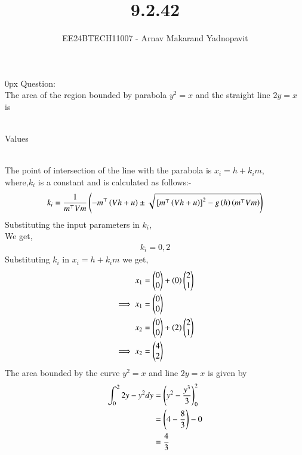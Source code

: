 \documentclass[journal]{IEEEtran}
\begin{document}

\title{9.2.42}
\author{EE24BTECH11007 - Arnav Makarand Yadnopavit}
{\let\newpage\relax\maketitle}
\renewcommand{\thefigure}{\theenumi}
\renewcommand{\thetable}{\theenumi}
\setlength{\intextsep}{10pt} %
\renewcommand{\thetable}{\theenumi}
\parindent 0px
Question:\\
The area of the region bounded by parabola $y^2 = x$ and the straight line $2y = x$ is\\
\solution\\
\begin{table}[h]
    \centering
    
    \caption{Values}
    \label{tab:1}
\end{table}\\
The point of intersection of the line with the parabola is $x_i=h+k_i m$,\\
where,$k_i$ is a constant and is calculated as follows:-
\begin{align}
    k_i=\frac{1}{m^\top Vm}\left(-m^\top \left(Vh+u\right)\pm \sqrt{{}\left[m^\top \left(Vh+u\right)\right]^2-g\left(h\right)\left(m^\top Vm\right)}\right)
\end{align}
Substituting the input parameters in $k_i$,\\
We get,\\
\begin{align}
    k_i= 0, 2
\end{align}
Substituting $k_i$ in $x_i=h+k_i m$  we get,\\
\begin{align}
     x_1&=\begin{pmatrix}0\\0\end{pmatrix}+\left(0\right)\begin{pmatrix}2\\1\end{pmatrix}\\
    \implies x_1 &=\begin{pmatrix}0\\0\end{pmatrix}\\
    x_2 &=\begin{pmatrix}0\\0\end{pmatrix}+\left(2\right)\begin{pmatrix}2\\1\end{pmatrix}\\
    \implies x_2&=\begin{pmatrix}4\\2\end{pmatrix}
\end{align}
The area bounded by the curve $y^2 = x$ and line $2y = x$ is given by
\begin{align}
    \int_{0}^{2} 2y-y^2 dy &= \left(y^2-\frac{y^3}{3}\right)_{0}^{2} \\
    &= \left(4-\frac{8}{3}\right)-0\\
    &= \frac{4}{3} 
\end{align}
\end{document}
